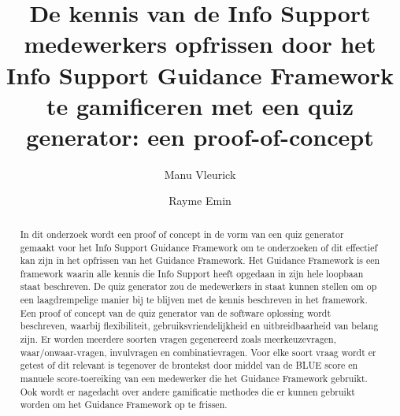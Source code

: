 \documentclass{hogent-article}
\title{De kennis van de Info Support medewerkers opfrissen door het Info Support Guidance Framework te gamificeren met een quiz generator: een proof-of-concept}
\author{Manu Vleurick}
\author{Rayme Emin}
\begin{document}
    
\begin{abstract}
In dit onderzoek wordt een proof of concept in de vorm van een quiz generator gemaakt voor het Info Support Guidance Framework om te onderzoeken of dit effectief kan zijn in het opfrissen van het Guidance Framework. Het Guidance Framework is een framework waarin alle kennis die Info Support heeft opgedaan in zijn hele loopbaan staat beschreven. De quiz generator zou de medewerkers in staat kunnen stellen om op een laagdrempelige manier bij te blijven met de kennis beschreven in het framework. Een proof of concept van de quiz generator van de software oplossing wordt beschreven, waarbij flexibiliteit, gebruiksvriendelijkheid en uitbreidbaarheid van belang zijn. Er worden meerdere soorten vragen gegenereerd zoals meerkeuzevragen, waar/onwaar-vragen, invulvragen en combinatievragen. Voor elke soort vraag wordt er getest of dit relevant is tegenover de brontekst door middel van de BLUE score en manuele score-toereiking van een medewerker die het Guidance Framework gebruikt. Ook wordt er nagedacht over andere gamificatie methodes die er kunnen gebruikt worden om het Guidance Framework op te frissen.

\end{abstract}
    
\tableofcontents
    


\printbibliography[heading=bibintoc]
    
\end{document}
